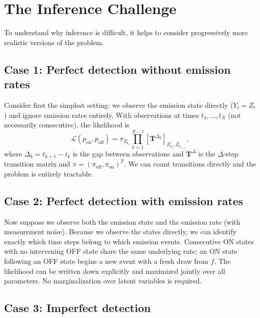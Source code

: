 \documentclass[11pt]{article}
\begin{document}
\section{The Inference Challenge}
\label{sec:challenge}

To understand why inference is difficult, it helps to consider progressively more realistic versions of the problem.

\subsection{Case 1: Perfect detection without emission rates}

Consider first the simplest setting: we observe the emission state directly ($Y_t = Z_t$) and ignore emission rates entirely. With observations at times $t_1, \ldots, t_N$ (not necessarily consecutive), the likelihood is
\begin{equation}
    \mathcal{L}(p_{\text{on}}, p_{\text{off}}) = \pi_{Z_{t_1}} \prod_{k=1}^{N-1} [\mathbf{T}^{\Delta_k}]_{Z_{t_k}, Z_{t_{k+1}}},
\end{equation}
where $\Delta_k = t_{k+1} - t_k$ is the gap between observations and $\mathbf{T}^{\Delta}$ is the $\Delta$-step transition matrix and $\pi=(\pi_\text{off}, \pi_\text{on})^T$. We can count transitions directly and the problem is entirely tractable.

\subsection{Case 2: Perfect detection with emission rates}

Now suppose we observe both the emission state and the emission rate (with measurement noise). Because we observe the states directly, we can identify exactly which time steps belong to which emission events. Consecutive ON states with no intervening OFF state share the same underlying rate; an ON state following an OFF state begins a new event with a fresh draw from $f$. The likelihood can be written down explicitly and maximized jointly over all parameters. No marginalization over latent variables is required.

\subsection{Case 3: Imperfect detection}
\end{document}
